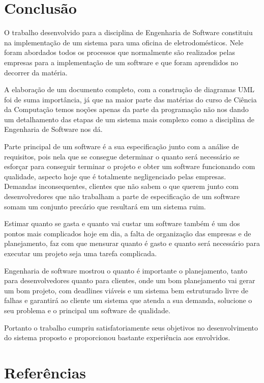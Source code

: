 \documentclass[a4paper,10pt]{article}
\begin{document}
\section{Conclusão}

O trabalho desenvolvido para a disciplina de Engenharia de Software constituiu na implementação de um sistema para uma oficina de eletrodomésticos. Nele foram abordados todos os processos que normalmente são realizados pelas empresas para a implementação de um software e que foram aprendidos no decorrer da matéria. 

A elaboração de um documento completo, com a construção de diagramas UML foi de suma importância, já que na maior parte das matérias do curso de Ciência da Computação temos noções apenas da parte da programação não nos dando um detalhamento das etapas de um sistema mais complexo como a disciplina de Engenharia de Software nos dá. 

Parte principal de um software é a sua especificação junto com a análise de requisitos, pois nela que se consegue determinar o quanto será necessário se esforçar para conseguir terminar o projeto e obter um software funcionando com qualidade, aspecto hoje que é totalmente negligenciado pelas empresas. Demandas inconsequentes, clientes que não sabem o que querem junto com desenvolvedores que não trabalham a parte de especificação de um software somam um conjunto precário que resultará em um sistema ruim. 

Estimar quanto se gasta e quanto vai custar um software também é um dos pontos mais complicados hoje em dia, a falta de organização das empresas e de planejamento, faz com que mensurar quanto é gasto e quanto será necessário para executar um projeto seja uma tarefa complicada. 

Engenharia de software mostrou o quanto é importante o planejamento, tanto para desenvolvedores quanto para clientes, onde um bom planejamento vai gerar um bom projeto, com deadlines viáveis e um sistema bem estruturado livre de falhas e garantirá ao cliente um sistema que atenda a sua demanda, solucione o seu problema e o principal um software de qualidade.

Portanto o trabalho cumpriu satisfatoriamente seus objetivos no desenvolvimento do sistema proposto e proporcionou bastante experiência aos envolvidos.

\section{Referências}
\end{document}
